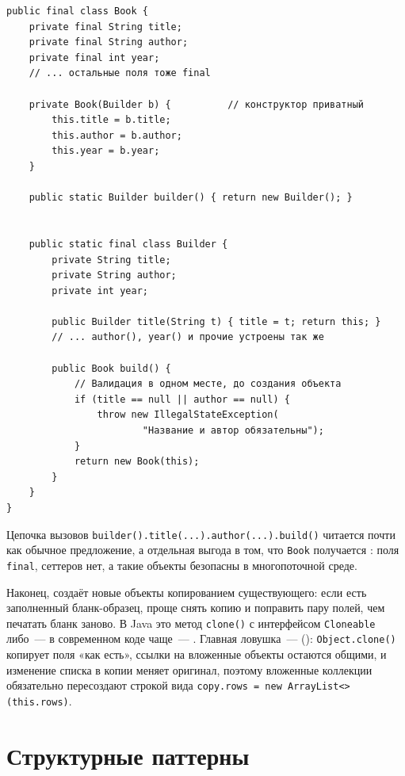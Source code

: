 \begin{listing}[H]
\begin{verbatim}
public final class Book {
    private final String title;
    private final String author;
    private final int year;
    // ... остальные поля тоже final

    private Book(Builder b) {          // конструктор приватный
        this.title = b.title;
        this.author = b.author;
        this.year = b.year;
    }

    public static Builder builder() { return new Builder(); }


    public static final class Builder {
        private String title;
        private String author;
        private int year;

        public Builder title(String t) { title = t; return this; }
        // ... author(), year() и прочие устроены так же

        public Book build() {
            // Валидация в одном месте, до создания объекта
            if (title == null || author == null) {
                throw new IllegalStateException(
                        "Название и автор обязательны");
            }
            return new Book(this);
        }
    }
}
\end{verbatim}
\caption{Строитель собирает неизменяемую книгу}
\label{lst:11-4}
\end{listing}

Цепочка вызовов \texttt{builder().title(...).author(...).build()} читается почти
как обычное предложение, а отдельная выгода в том, что \texttt{Book} получается
: поля \texttt{final}, сеттеров нет, а такие объекты
безопасны в многопоточной среде.

Наконец,  создаёт новые объекты копированием существующего: если
есть заполненный бланк-образец, проще снять копию и поправить пару полей, чем
печатать бланк заново. В Java это метод \texttt{clone()} с интерфейсом
\texttt{Cloneable} либо~--- в современном коде чаще~--- . Главная ловушка~--- 
(): \texttt{Object.clone()} копирует поля «как есть», ссылки
на вложенные объекты остаются общими, и изменение списка в копии меняет
оригинал, поэтому вложенные коллекции обязательно пересоздают строкой вида
\texttt{copy.rows = new ArrayList<>(this.rows)}.

\section{Структурные паттерны}

